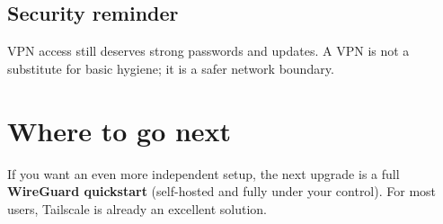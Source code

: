 \subsection*{Security reminder}
VPN access still deserves strong passwords and updates.
A VPN is not a substitute for basic hygiene; it is a safer network boundary.

\section{Where to go next}
If you want an even more independent setup, the next upgrade is a full \textbf{WireGuard quickstart}
(self-hosted and fully under your control). For most users, Tailscale is already an excellent solution. 